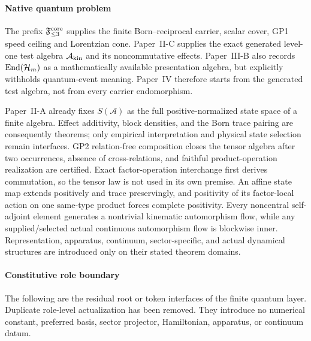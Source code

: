 \documentclass[12pt,a4paper]{article}
\begin{document}
\paragraph{Native quantum problem}
\label{p4:subsec:native-quantum-problem}

The prefix \(\mathfrak F_{\le3}^{\rm core}\) supplies the finite
Born--reciprocal carrier, scalar cover, GP1 speed ceiling and Lorentzian cone.
Paper~II-C supplies the exact generated level-one test algebra
\(\mathcal A_{\rm kin}\) and its noncommutative effects.  Paper~III-B also
records \(\operatorname{End}(\mathcal H_m)\) as a mathematically available presentation
algebra, but explicitly withholds quantum-event meaning.  Paper~IV therefore
starts from the generated test algebra, not from every carrier endomorphism.

Paper~II-A already fixes \(S(\mathcal A)\) as the full positive-normalized
state space of a finite algebra.  Effect additivity, block densities, and the
Born trace pairing are consequently theorems; only empirical interpretation
and physical state selection remain interfaces.  GP2 relation-free
composition closes the tensor algebra after two occurrences, absence of
cross-relations, and faithful product-operation realization are certified.
Exact factor-operation interchange first derives commutation, so the tensor
law is not used in its own premise.  An affine state map extends positively
and trace preservingly, and positivity of its factor-local action on one
same-type product forces complete positivity.  Every noncentral self-adjoint element generates a nontrivial
kinematic automorphism flow, while any supplied/selected actual continuous
automorphism flow is blockwise inner.
Representation, apparatus, continuum, sector-specific, and actual dynamical
structures are introduced only on their stated theorem domains.



\paragraph{Constitutive role boundary}
\label{p4:subsec:constitutive-role-boundary}

The following are the residual root or token interfaces of the finite quantum
layer.  Duplicate role-level actualization has been removed.  They introduce no
numerical constant, preferred basis, sector projector, Hamiltonian, apparatus,
or continuum datum.
\end{document}
